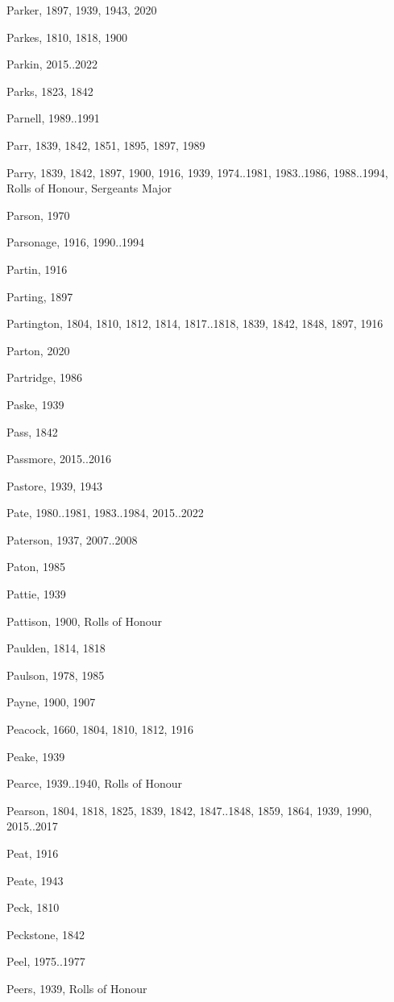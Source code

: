 {\begin{theindex}
\item Parker, 1897, 1939, 1943, 2020
\item Parkes, 1810, 1818, 1900
\item Parkin, 2015..2022
\item Parks, 1823, 1842
\item Parnell, 1989..1991
\item Parr, 1839, 1842, 1851, 1895, 1897, 1989
\item Parry, 1839, 1842, 1897, 1900, 1916, 1939, 1974..1981, 1983..1986, 1988..1994, Rolls of Honour, Sergeants Major
\item Parson, 1970
\item Parsonage, 1916, 1990..1994
\item Partin, 1916
\item Parting, 1897
\item Partington, 1804, 1810, 1812, 1814, 1817..1818, 1839, 1842, 1848, 1897, 1916
\item Parton, 2020
\item Partridge, 1986
\item Paske, 1939
\item Pass, 1842
\item Passmore, 2015..2016
\item Pastore, 1939, 1943
\item Pate, 1980..1981, 1983..1984, 2015..2022
\item Paterson, 1937, 2007..2008
\item Paton, 1985
\item Pattie, 1939
\item Pattison, 1900, Rolls of Honour
\item Paulden, 1814, 1818
\item Paulson, 1978, 1985
\item Payne, 1900, 1907
\item Peacock, 1660, 1804, 1810, 1812, 1916
\item Peake, 1939
\item Pearce, 1939..1940, Rolls of Honour
\item Pearson, 1804, 1818, 1825, 1839, 1842, 1847..1848, 1859, 1864, 1939, 1990, 2015..2017
\item Peat, 1916
\item Peate, 1943
\item Peck, 1810
\item Peckstone, 1842
\item Peel, 1975..1977
\item Peers, 1939, Rolls of Honour

\end{theindex}}
